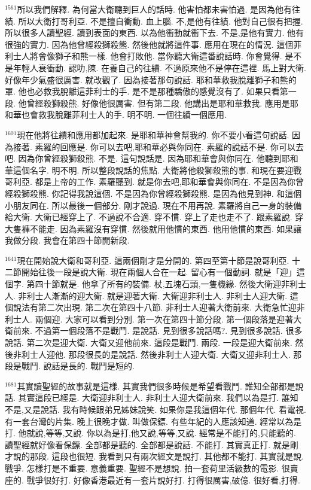 \documentclass{book}
\begin{document}
$^{1561}$所以我們解釋.
為何當大衛聽到巨人的話時.
他害怕都未害怕過.
是因為他有往績.
所以大衛打哥利亞.
不是擅自衝動.
血上腦.
不,是他有往績.
他對自己很有把握.
所以很多人讀聖經.
讀到表面的東西.
以為他衝動就衝下去.
不是,是他有實力.
他有很強的實力.
因為他曾經殺獅殺熊.
然後他就將這件事.
應用在現在的情況.
這個菲利士人將會像獅子和熊一樣.
他會打敗他.
當你聽大衛這番說話時.
你會覺得.
是不是年輕人衰衝動.
認叻,陳.
在養自己的往績.
不過原來他不是停在這裡.
馬上對大衛.
好像年少氣盛很厲害.
就改觀了.
因為接著那句說話.
耶和華救我脫離獅子和熊的罩.
他也必救我脫離這菲利士的手.
是不是那種驕傲的感覺沒有了.
如果只看第一段.
他曾經殺獅殺熊.
好像他很厲害.
但有第二段.
他講出是耶和華救我.
應用是耶和華也會救我脫離菲利士人的手.
明不明.
一個往績一個應用.

$^{1601}$現在他將往績和應用都加起來.
是耶和華神會幫我的.
你不要小看這句說話.
因為接著.
素羅的回應是.
你可以去吧,耶和華必與你同在.
素羅的說話不是.
你可以去吧.
因為你曾經殺獅殺熊.
不是.
這句說話是.
因為耶和華會與你同在.
他聽到耶和華這個名字.
明不明.
所以整段說話的焦點.
大衛將他殺獅殺熊的事.
和現在要迎戰哥利亞.
都是上帝的工作.
素羅聽到.
就是你去吧,耶和華會與你同在.
不是因為你曾經殺獅殺熊.
你記得我說這個.
不是因為你曾經殺獅殺熊.
是因為他見到神.
和這個小朋友同在.
所以最後一個部分.
剛才說過.
現在不用再說.
素羅將自己一身的裝備給大衛.
大衛已經穿上了.
不過說不合適.
穿不慣.
穿上了走也走不了.
跟素羅說.
穿大隻褲不能走.
因為素羅沒有穿慣.
然後就用他慣的東西.
他用他慣的東西.
如果讓我做分段.
我會在第四十節開新段.

$^{1641}$現在開始說大衛和哥利亞.
這兩個剛才是分開的.
第四至第十節是說哥利亞.
十二節開始往後一段是說大衛.
現在兩個人合在一起.
留心有一個動詞.
就是「迎」這個字.
第四十節就是.
他拿了所有的裝備.
杖,五塊石頭,一隻機緣.
然後大衛迎非利士人.
非利士人漸漸的迎大衛.
就是迎著大衛.
大衛迎非利士人.
非利士人迎大衛.
這個說法有第二次出現.
第二次在第四十八節.
非利士人迎著大衛前來.
大衛急忙迎非利士人.
兩個迎.
大家可以看到分別.
第一次在第四十節分段.
第一個段落是迎著大衛前來.
不過第一個段落不是戰鬥.
是說話.
見到很多說話嗎?.
見到很多說話.
很多說話.
第二次是迎大衛.
大衛又迎他前來.
這段是戰鬥.
兩段.
一段是迎大衛前來.
然後非利士人迎他.
那段很長的是說話.
然後非利士人迎大衛.
大衛又迎非利士人.
那段是戰鬥.
說話是長的.
戰鬥是短的.

$^{1681}$其實讀聖經的故事就是這樣.
其實我們很多時候是希望看戰鬥.
誰知全部都是說話.
其實這段已經是.
大衛迎非利士人.
非利士人迎大衛前來.
我們以為是打.
誰知不是,又是說話.
我有時候跟弟兄姊妹說笑.
如果你是我這個年代.
那個年代.
看電視.
有一套台灣的片集.
晚上很晚才做.
叫做保鏢.
有些年紀的人應該知道.
經常以為是打.
他就說,等等,又說.
你以為是打,他又說,等等,又說.
經常是不能打的,只能聽的.
讀聖經就好像看保鏢.
全部都是聽的.
全部都是說話.
不能打.
其實真正打.
就是剛才說的那段.
這段也很短.
我看到只有兩次經文是說打.
其他都不能打.
其實就是說.
戰爭.
怎樣打是不重要.
意義重要.
聖經不是想說.
拍一套荷里活級數的電影.
很賣座的.
戰爭很好打.
好像香港最近有一套片說好打.
打得很厲害,破億.
很好看,打得.
\end{document}
